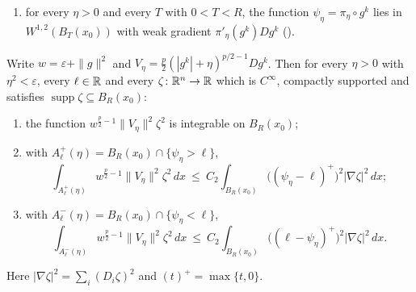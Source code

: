 \begin{helper}
\begin{enumerate}
  weak gradient $G_2$;
\item[(H12)] for every $\eta>0$ and every $T$ with $0<T<R$, the function
  $\psi_\eta=\pi_\eta\circ g^k$ lies in $W^{1,2}(B_T(x_0))$ with weak gradient
  $\pi'_\eta(g^k)Dg^k$ ().
\end{enumerate}
Write $w=\varepsilon+\|g\|^2$ and
$V_\eta=\tfrac p2(|g^k|+\eta)^{p/2-1}Dg^k$.  Then for every $\eta>0$ with
$\eta^2<\varepsilon$, every $\ell\in\mathbb{R}$ and every $\zeta\colon\mathbb{R}^n\to\mathbb{R}$ which
is $C^\infty$, compactly supported and satisfies
$\operatorname{supp}\zeta\subseteq B_R(x_0)$:
\begin{enumerate}
\item[(i)] the function $w^{\frac p2-1}\|V_\eta\|^2\zeta^2$ is integrable on
  $B_R(x_0)$;
\item[(ii)] with $A^+_\ell(\eta)=B_R(x_0)\cap\{\psi_\eta>\ell\}$,
  \[
  \int_{A^+_\ell(\eta)}w^{\frac p2-1}\|V_\eta\|^2\zeta^2\,dx
  \ \le\ C_2\int_{B_R(x_0)}\bigl((\psi_\eta-\ell)^+\bigr)^2|\nabla\zeta|^2\,dx ;
  \]
\item[(iii)] with $A^-_\ell(\eta)=B_R(x_0)\cap\{\psi_\eta<\ell\}$,
  \[
  \int_{A^-_\ell(\eta)}w^{\frac p2-1}\|V_\eta\|^2\zeta^2\,dx
  \ \le\ C_2\int_{B_R(x_0)}\bigl((\ell-\psi_\eta)^+\bigr)^2|\nabla\zeta|^2\,dx .
  \]
\end{enumerate}
Here $|\nabla\zeta|^2=\sum_i(D_i\zeta)^2$ and $(t)^+=\max\{t,0\}$.
\end{helper}
